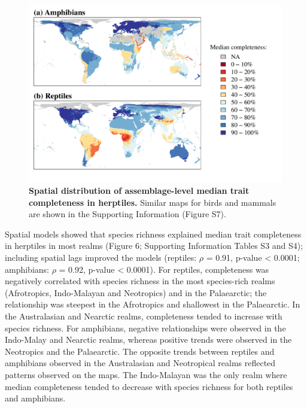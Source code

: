 \begin{figure}[h!]
\centering
\includegraphics[scale=0.7]{figures/Chapter1/Figure_5}
\caption[Spatial distribution of assemblage-level median trait completeness in herptiles.]{\textbf{Spatial distribution of assemblage-level median trait completeness in herptiles.} Similar maps for birds and mammals are shown in the Supporting Information (Figure S7).}
\label{1_Map}
\end{figure}


Spatial models showed that species richness explained median trait completeness in herptiles in most realms (Figure 6; Supporting Information Tables S3 and S4); including spatial lags improved the models (reptiles: $\rho$ = 0.91, p-value < 0.0001; amphibians: $\rho$ = 0.92, p-value < 0.0001). For reptiles, completeness was negatively correlated with species richness in the most species-rich realms (Afrotropics, Indo-Malayan and Neotropics) and in the Palaearctic; the relationship was steepest in the Afrotropics and shallowest in the Palaearctic. In the Australasian and Nearctic realms, completeness tended to increase with species richness. For amphibians, negative relationships were observed in the Indo-Malay and Nearctic realms, whereas positive trends were observed in the Neotropics and the Palaearctic. The opposite trends between reptiles and amphibians observed in the Australasian and Neotropical realms reflected patterns observed on the maps. The Indo-Malayan was the only realm where median completeness tended to decrease with species richness for both reptiles and amphibians.

